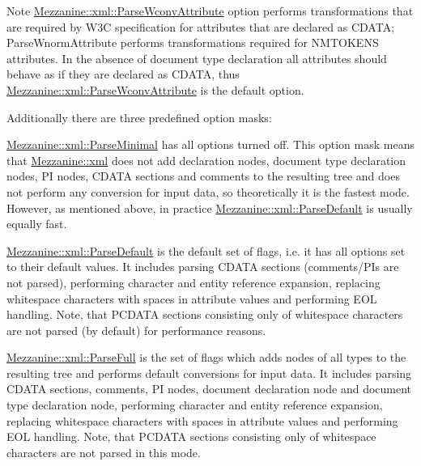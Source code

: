 \begin{DoxyNote}{Note}
\hyperlink{namespaceMezzanine_1_1xml_a9e9a386f6a2e7dac28df4b581d8f49b3}{Mezzanine::xml::ParseWconvAttribute} option performs transformations that are required by W3C specification for attributes that are declared as CDATA; ParseWnormAttribute performs transformations required for NMTOKENS attributes. In the absence of document type declaration all attributes should behave as if they are declared as CDATA, thus \hyperlink{namespaceMezzanine_1_1xml_a9e9a386f6a2e7dac28df4b581d8f49b3}{Mezzanine::xml::ParseWconvAttribute} is the default option.
\end{DoxyNote}
Additionally there are three predefined option masks:
\begin{DoxyItemize}
\item \hyperlink{namespaceMezzanine_1_1xml_a019444c8f75908387adc214812b1f5ef}{Mezzanine::xml::ParseMinimal} has all options turned off. This option mask means that \hyperlink{namespaceMezzanine_1_1xml}{Mezzanine::xml} does not add declaration nodes, document type declaration nodes, PI nodes, CDATA sections and comments to the resulting tree and does not perform any conversion for input data, so theoretically it is the fastest mode. However, as mentioned above, in practice \hyperlink{namespaceMezzanine_1_1xml_a0eb617274d4b3cb604f3120bcdaf9850}{Mezzanine::xml::ParseDefault} is usually equally fast.
\item \hyperlink{namespaceMezzanine_1_1xml_a0eb617274d4b3cb604f3120bcdaf9850}{Mezzanine::xml::ParseDefault} is the default set of flags, i.e. it has all options set to their default values. It includes parsing CDATA sections (comments/PIs are not parsed), performing character and entity reference expansion, replacing whitespace characters with spaces in attribute values and performing EOL handling. Note, that PCDATA sections consisting only of whitespace characters are not parsed (by default) for performance reasons.
\item \hyperlink{namespaceMezzanine_1_1xml_a14a1b1a8836c431265e35c5bbc60655d}{Mezzanine::xml::ParseFull} is the set of flags which adds nodes of all types to the resulting tree and performs default conversions for input data. It includes parsing CDATA sections, comments, PI nodes, document declaration node and document type declaration node, performing character and entity reference expansion, replacing whitespace characters with spaces in attribute values and performing EOL handling. Note, that PCDATA sections consisting only of whitespace characters are not parsed in this mode.
\end{DoxyItemize}

